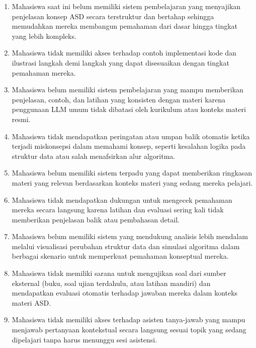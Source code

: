 \begin{enumerate}
    \item Mahasiswa saat ini belum memiliki sistem pembelajaran yang menyajikan penjelasan konsep ASD secara terstruktur dan bertahap sehingga memudahkan mereka membangun pemahaman dari dasar hingga tingkat yang lebih kompleks.

    \item Mahasiswa tidak memiliki akses terhadap contoh implementasi kode dan ilustrasi langkah demi langkah yang dapat disesuaikan dengan tingkat pemahaman mereka.

    \item Mahasiswa belum memiliki sistem pembelajaran yang mampu memberikan penjelasan, contoh, dan latihan yang konsisten dengan materi karena penggunaan LLM umum tidak dibatasi oleh kurikulum atau konteks materi resmi.

    \item Mahasiswa tidak mendapatkan peringatan atau umpan balik otomatis ketika terjadi miskonsepsi dalam memahami konsep, seperti kesalahan logika pada struktur data atau salah menafsirkan alur algoritma.

    \item Mahasiswa belum memiliki sistem terpadu yang dapat memberikan ringkasan materi yang relevan berdasarkan konteks materi yang sedang mereka pelajari.

    \item Mahasiswa tidak mendapatkan dukungan untuk mengecek pemahaman mereka secara langsung karena latihan dan evaluasi sering kali tidak memberikan penjelasan balik atau pembahasan detail.

    \item Mahasiswa belum memiliki sistem yang mendukung analisis lebih mendalam melalui visualisasi perubahan struktur data dan simulasi algoritma dalam berbagai skenario untuk memperkuat pemahaman konseptual mereka.

    \item Mahasiswa tidak memiliki sarana untuk mengujikan soal dari sumber eksternal (buku, soal ujian terdahulu, atau latihan mandiri) dan mendapatkan evaluasi otomatis terhadap jawaban mereka dalam konteks materi ASD.

    \item Mahasiswa tidak memiliki akses terhadap asisten tanya-jawab yang mampu menjawab pertanyaan kontekstual secara langsung sesuai topik yang sedang dipelajari tanpa harus menunggu sesi asistensi.
\end{enumerate}

